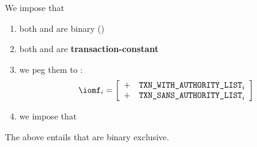 We impose that
\begin{enumerate}
	\item both \transactionTypeWithAuthorityLists{} and \transactionTypeWithAuthorityLists{} are binary (\sanityCheck)
	\item both \transactionTypeWithAuthorityLists{} and \transactionTypeWithAuthorityLists{} are \textbf{transaction-constant}
	\item we peg them to \iomf{}:
		\[
			\iomf _{i}
			=
			\left[ \begin{array}{cl}
				+ & \transactionTypeWithAuthorityLists _{i} \\
				+ & \transactionTypeSansAuthorityLists _{i} \\
			\end{array} \right]
		\]
	\item we impose that
\end{enumerate}
\saNote{} \label{rlp auth: generalities: transactions with or sans authority list: exclusivity}
The above entails that
\transactionTypeWithAuthorityLists{}
\transactionTypeSansAuthorityLists{}
are binary exclusive.

